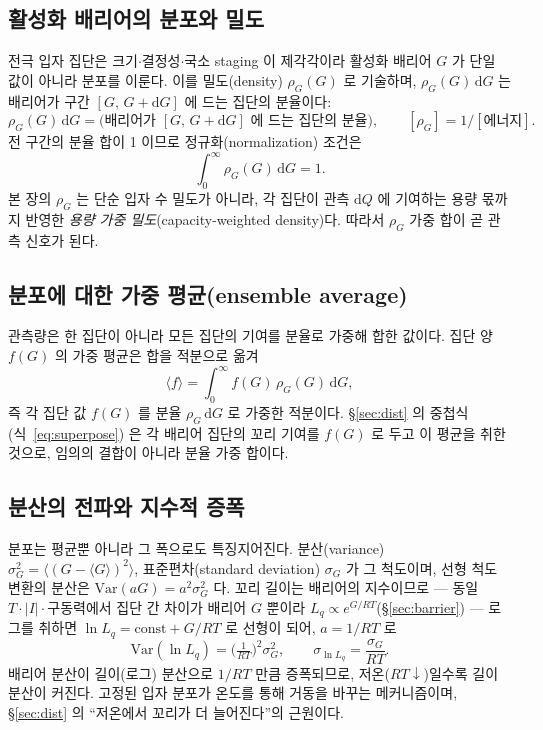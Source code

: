 \documentclass[11pt,a4paper]{article}
\newcommand{\dd}{\mathrm{d}}
\begin{document}
\subsection{활성화 배리어의 분포와 밀도}
전극 입자 집단은 크기$\cdot$결정성$\cdot$국소 staging 이 제각각이라 활성화 배리어 $G$ 가 단일 값이 아니라 분포를
이룬다. 이를 밀도(density) $\rho_G(G)$ 로 기술하며, $\rho_G(G)\,\dd G$ 는 배리어가 구간 $[G,\,G+\dd G]$ 에 드는
집단의 분율이다:
\begin{equation}
\rho_G(G)\,\dd G=\big(\text{배리어가 }[G,\,G+\dd G]\text{ 에 드는 집단의 분율}\big),\qquad [\rho_G]=1/[\text{에너지}].
\label{eq:density}
\end{equation}
전 구간의 분율 합이 1 이므로 정규화(normalization) 조건은
\begin{equation}
\int_0^\infty\rho_G(G)\,\dd G=1.
\label{eq:norm}
\end{equation}
본 장의 $\rho_G$ 는 단순 입자 수 밀도가 아니라, 각 집단이 관측 $\dd Q$ 에 기여하는 용량 몫까지 반영한 \emph{용량 가중 밀도}(capacity-weighted density)다.
따라서 $\rho_G$ 가중 합이 곧 관측 신호가 된다.

\subsection{분포에 대한 가중 평균(ensemble average)}
관측량은 한 집단이 아니라 모든 집단의 기여를 분율로 가중해 합한 값이다. 집단 양 $f(G)$ 의 가중 평균은 합을
적분으로 옮겨
\begin{equation}
\langle f\rangle=\int_0^\infty f(G)\,\rho_G(G)\,\dd G,
\label{eq:wavg}
\end{equation}
즉 각 집단 값 $f(G)$ 를 분율 $\rho_G\,\dd G$ 로 가중한 적분이다. \S\ref{sec:dist} 의 중첩식(식~\eqref{eq:superpose})
은 각 배리어 집단의 꼬리 기여를 $f(G)$ 로 두고 이 평균을 취한 것으로, 임의의 결합이 아니라 분율 가중 합이다.

\subsection{분산의 전파와 지수적 증폭}
분포는 평균뿐 아니라 그 폭으로도 특징지어진다. 분산(variance) $\sigma_G^2=\langle(G-\langle G\rangle)^2\rangle$,
표준편차(standard deviation) $\sigma_G$ 가 그 척도이며, 선형 척도 변환의 분산은 $\mathrm{Var}(aG)=a^2\sigma_G^2$ 다.
꼬리 길이는 배리어의 지수이므로 — 동일 $T\cdot|I|\cdot$구동력에서 집단 간 차이가 배리어 $G$ 뿐이라
$L_q\propto e^{G/RT}$(\S\ref{sec:barrier}) — 로그를 취하면 $\ln L_q=\text{const}+G/RT$ 로 선형이 되어, $a=1/RT$ 로
\begin{equation}
\mathrm{Var}(\ln L_q)=\Big(\tfrac{1}{RT}\Big)^2\sigma_G^2,\qquad \sigma_{\ln L_q}=\frac{\sigma_G}{RT}.
\label{eq:varprop}
\end{equation}
배리어 분산이 길이(로그) 분산으로 $1/RT$ 만큼 증폭되므로, 저온($RT\downarrow$)일수록 길이 분산이 커진다. 고정된
입자 분포가 온도를 통해 거동을 바꾸는 메커니즘이며, \S\ref{sec:dist} 의 ``저온에서 꼬리가 더 늘어진다''의 근원이다.
\end{document}
